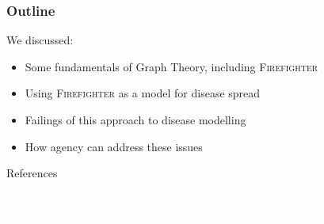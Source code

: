 \documentclass[unknownkeysallowed]{beamer}
\begin{document}
\begin{frame}
\frametitle{Outline}
\tableofcontents[currentsection]
\end{frame}


\begin{frame}

We discussed:

\begin{itemize}
	\item Some fundamentals of Graph Theory, including {\scshape Firefighter}
	\item Using {\scshape Firefighter} as a model for disease spread
	\item Failings of this approach to disease modelling
	\item How agency can address these issues
\end{itemize}

\end{frame}

\begin{frame}{References}

\nocite{*}

\end{frame}


{

  \begin{frame}[plain]

    \begin{columns}

      \begin{column}[l]{5cm}
      \end{column}

      \begin{column}[r]{5cm}
        \textcolor{white}{
          Questions?
        }
      \end{column}

    \end{columns}
  \end{frame}
}
\end{document}
